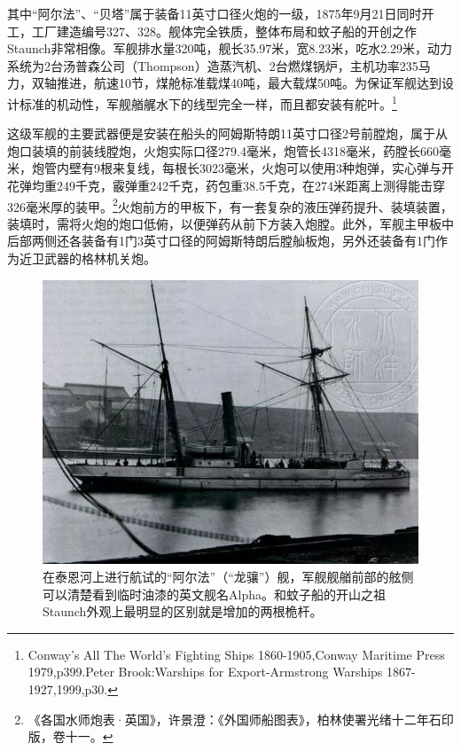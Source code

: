 \documentclass[12pt,UTF8]{ctexbook}
\begin{document}
其中“阿尔法”、“贝塔”属于装备11英寸口径火炮的一级，1875年9月21日同时开工，工厂建造编号327、328。舰体完全铁质，整体布局和蚊子船的开创之作Staunch非常相像。军舰排水量320吨，舰长35.97米，宽8.23米，吃水2.29米，动力系统为2台汤普森公司（Thompson）造蒸汽机、2台燃煤锅炉，主机功率235马力，双轴推进，航速10节，煤舱标准载煤40吨，最大载煤50吨。为保证军舰达到设计标准的机动性，军舰艏艉水下的线型完全一样，而且都安装有舵叶。\footnote{Conway's All The World's Fighting Ships 1860-1905,Conway Maritime Press 1979,p399.Peter Brook:Warships for Export-Armstrong Warships 1867-1927,1999,p30.}

这级军舰的主要武器便是安装在船头的阿姆斯特朗11英寸口径2号前膛炮，属于从炮口装填的前装线膛炮，火炮实际口径279.4毫米，炮管长4318毫米，药膛长660毫米，炮管内壁有9根来复线，每根长3023毫米，火炮可以使用3种炮弹，实心弹与开花弹均重249千克，霰弹重242千克，药包重38.5千克，在274米距离上测得能击穿326毫米厚的装甲。\footnote{《各国水师炮表·英国》，许景澄：《外国师船图表》，柏林使署光绪十二年石印版，卷十一。}火炮前方的甲板下，有一套复杂的液压弹药提升、装填装置，装填时，需将火炮的炮口低俯，以便弹药从前下方装入炮膛。此外，军舰主甲板中后部两侧还各装备有1门3英寸口径的阿姆斯特朗后膛舢板炮，另外还装备有1门作为近卫武器的格林机关炮。

\begin{figure}[htbp]
	\centering
	\includegraphics[width=1\linewidth]{Images/6}
	\caption{在泰恩河上进行航试的“阿尔法”（“龙骧”）舰，军舰舰艏前部的舷侧可以清楚看到临时油漆的英文舰名Alpha。和蚊子船的开山之祖Staunch外观上最明显的区别就是增加的两根桅杆。}
	\label{fig:1}
\end{figure}
\end{document}
